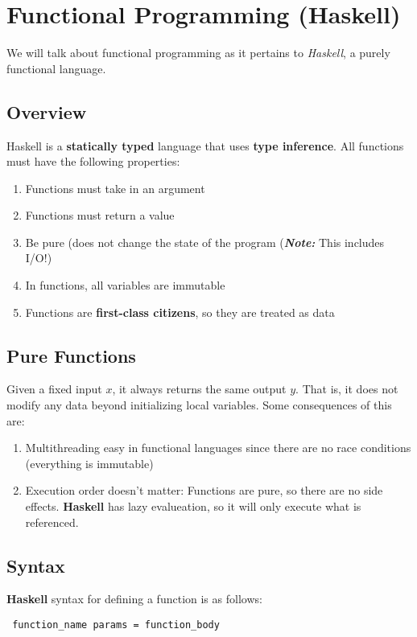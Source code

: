 \documentclass{article}
\begin{document}
\section{Functional Programming (Haskell)} We will talk about
functional programming as it pertains to \textit{Haskell}, a purely
functional language. 
\subsection{Overview} Haskell is a \textbf{statically typed} language
that uses \textbf{type inference}. All functions must have the
following properties: 
\begin{enumerate}[label=(\roman*),align=left]
\item Functions must take in an argument
\item Functions must return a value
\item Be pure (does not change the state of the program
(\textit{\textbf{Note:}} This includes I/O!)
\item In functions, all variables are immutable
\item Functions are \textbf{first-class citizens}, so they are treated
as data
\end{enumerate}

\subsection{Pure Functions} Given a fixed input $x$, it always returns
the same output $y$. That is, it does not modify any data beyond
initializing local variables. Some consequences of this are:
\begin{enumerate}[label=(\roman*),align=left]
\item Multithreading easy in functional languages since there are no
  race conditions (everything is immutable)
\item Execution order doesn't matter: Functions are pure, so there are
  no side effects. \textbf{Haskell} has lazy evalueation, so it will
  only execute what is referenced.
\end{enumerate}

\subsection{Syntax} \textbf{Haskell} syntax for defining a function is
as follows: 
\begin{verbatim} function_name params = function_body \end{verbatim}
\end{document}

